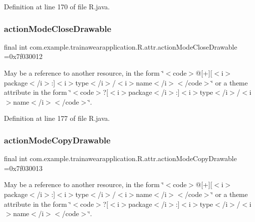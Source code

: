Definition at line 170 of file R.\+java.

\mbox{\label{classcom_1_1example_1_1trainawearapplication_1_1_r_1_1attr_a9bf929a554afa5193ed9f35c8f6007bd}} 
\subsubsection{\texorpdfstring{actionModeCloseDrawable}{actionModeCloseDrawable}}
{\footnotesize\ttfamily final int com.\+example.\+trainawearapplication.\+R.\+attr.\+action\+Mode\+Close\+Drawable =0x7f030012\hspace{0.3cm}{\ttfamily [static]}}

May be a reference to another resource, in the form \char`\"{}$<$code$>$@\mbox{[}+\mbox{]}\mbox{[}$<$i$>$package$<$/i$>$\+:\mbox{]}$<$i$>$type$<$/i$>$/$<$i$>$name$<$/i$>$$<$/code$>$\char`\"{} or a theme attribute in the form \char`\"{}$<$code$>$?\mbox{[}$<$i$>$package$<$/i$>$\+:\mbox{]}$<$i$>$type$<$/i$>$/$<$i$>$name$<$/i$>$$<$/code$>$\char`\"{}. 

Definition at line 177 of file R.\+java.

\mbox{\label{classcom_1_1example_1_1trainawearapplication_1_1_r_1_1attr_a0aa68a19f379d4ae2ff572ccaa0497a9}} 
\subsubsection{\texorpdfstring{actionModeCopyDrawable}{actionModeCopyDrawable}}
{\footnotesize\ttfamily final int com.\+example.\+trainawearapplication.\+R.\+attr.\+action\+Mode\+Copy\+Drawable =0x7f030013\hspace{0.3cm}{\ttfamily [static]}}

May be a reference to another resource, in the form \char`\"{}$<$code$>$@\mbox{[}+\mbox{]}\mbox{[}$<$i$>$package$<$/i$>$\+:\mbox{]}$<$i$>$type$<$/i$>$/$<$i$>$name$<$/i$>$$<$/code$>$\char`\"{} or a theme attribute in the form \char`\"{}$<$code$>$?\mbox{[}$<$i$>$package$<$/i$>$\+:\mbox{]}$<$i$>$type$<$/i$>$/$<$i$>$name$<$/i$>$$<$/code$>$\char`\"{}. 

